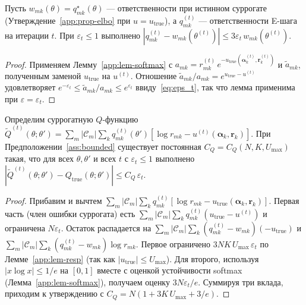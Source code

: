 \begin{lemma}
\label{app:lem-resp}
Пусть $w_{mk}(\theta) = q^{\star}_{mk}(\theta)$ ---
ответственности при истинном суррогате
(Утверждение~\ref{app:prop-elbo} при $u = u_{\mathrm{true}}$), а
$q^{(t)}_{mk}$ --- ответственности E-шага на итерации $t$. При
$\varepsilon_t \leq 1$ выполнено
$|q^{(t)}_{mk} - w_{mk}(\theta^{(t)})| \leq 3\varepsilon_t\, w_{mk}(\theta^{(t)})$.
\end{lemma}

\begin{proof}
Применяем Лемму~\ref{app:lem-softmax} с
$a_{mk} = r^{(t)}_{mk}\,e^{-u_{\mathrm{true}}(\boldsymbol{\alpha}^{(t)}_k, \mathbf{r}^{(t)}_k)}$
и $\tilde a_{mk}$, полученным заменой $u_{\mathrm{true}}$ на $u^{(t)}$.
Отношение $\tilde a_{mk}/a_{mk} = e^{u_{\mathrm{true}} - u^{(t)}}$
удовлетворяет
$e^{-\varepsilon_t} \leq \tilde a_{mk}/a_{mk} \leq e^{\varepsilon_t}$
ввиду~\eqref{eq:eps_t}, так что лемма применима при
$\varepsilon = \varepsilon_t$.
\end{proof}

\begin{lemma}
\label{app:lem-qdev}
Определим суррогатную $Q$-функцию
$\tilde Q^{(t)}(\theta;\theta') = \sum_{m} |\mathcal{C}_m|
\sum_{k} q^{(t)}_{mk}(\theta')[\log r_{mk} - u^{(t)}(\boldsymbol{\alpha}_k, \mathbf{r}_k)]$.
При Предположении~\ref{ass:bounded} существует постоянная
$C_Q = C_Q(N, K, U_{\max})$ такая, что для всех $\theta, \theta'$ и
всех $t$ с $\varepsilon_t \leq 1$ выполнено
$|\tilde Q^{(t)}(\theta;\theta') - Q_{\mathrm{true}}(\theta;\theta')|
\leq C_Q\,\varepsilon_t$.
\end{lemma}

\begin{proof}
Прибавим и вычтем
$\sum_m |\mathcal{C}_m| \sum_k q^{(t)}_{mk}[\log r_{mk} - u_{\mathrm{true}}(\boldsymbol{\alpha}_k, \mathbf{r}_k)]$.
Первая часть (член ошибки суррогата) есть
$\sum_m |\mathcal{C}_m| \sum_k q^{(t)}_{mk}(u_{\mathrm{true}} - u^{(t)})$
и ограничена $N\varepsilon_t$. Остаток распадается на
$\sum_m |\mathcal{C}_m| \sum_k (q^{(t)}_{mk} - w_{mk})(-u_{\mathrm{true}})$
и
$\sum_m |\mathcal{C}_m| \sum_k (q^{(t)}_{mk} - w_{mk})\log r_{mk}$.
Первое ограничено $3NK\,U_{\max}\,\varepsilon_t$ по
Лемме~\ref{app:lem-resp} (так как $|u_{\mathrm{true}}| \leq U_{\max}$).
Для второго, используя $|x\log x|\leq 1/e$ на $[0,1]$ вместе с оценкой
устойчивости softmax (Лемма~\ref{app:lem-softmax}), получаем оценку
$3N\varepsilon_t/e$. Суммируя три вклада, приходим к утверждению с
$C_Q = N(1 + 3K\,U_{\max} + 3/e)$.
\end{proof}

